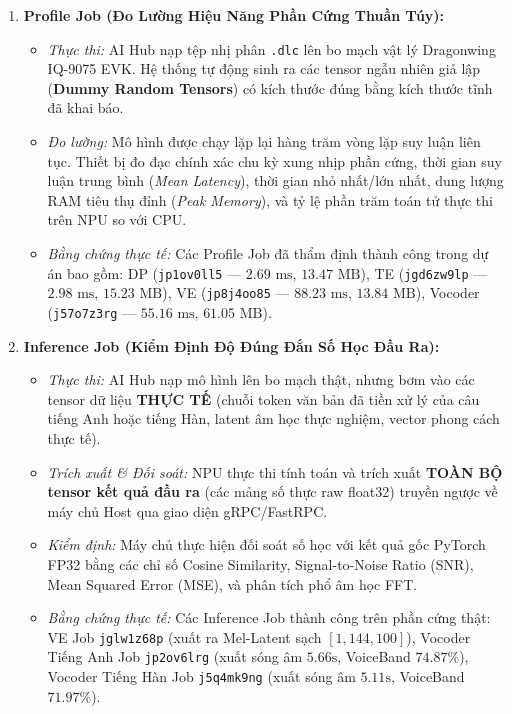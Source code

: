 \documentclass[11pt,a4paper,oneside,table]{report}
\begin{document}
\begin{enumerate}
    \item \textbf{Profile Job (Đo Lường Hiệu Năng Phần Cứng Thuần Túy):}
    \begin{itemize}
        \item \textit{Thực thi:} AI Hub nạp tệp nhị phân \texttt{.dlc} lên bo mạch vật lý Dragonwing IQ-9075 EVK. Hệ thống tự động sinh ra các tensor ngẫu nhiên giả lập (\textbf{Dummy Random Tensors}) có kích thước đúng bằng kích thước tĩnh đã khai báo.
        \item \textit{Đo lường:} Mô hình được chạy lặp lại hàng trăm vòng lặp suy luận liên tục. Thiết bị đo đạc chính xác chu kỳ xung nhịp phần cứng, thời gian suy luận trung bình (\textit{Mean Latency}), thời gian nhỏ nhất/lớn nhất, dung lượng RAM tiêu thụ đỉnh (\textit{Peak Memory}), và tỷ lệ phần trăm toán tử thực thi trên NPU so với CPU.
        \item \textit{Bằng chứng thực tế:} Các Profile Job đã thẩm định thành công trong dự án bao gồm: DP (\texttt{jp1ov0ll5} --- $2.69\text{ ms}$, $13.47\text{ MB}$), TE (\texttt{jgd6zw9lp} --- $2.98\text{ ms}$, $15.23\text{ MB}$), VE (\texttt{jp8j4oo85} --- $88.23\text{ ms}$, $13.84\text{ MB}$), Vocoder (\texttt{j57o7z3rg} --- $55.16\text{ ms}$, $61.05\text{ MB}$).
    \end{itemize}

    \item \textbf{Inference Job (Kiểm Định Độ Đúng Đắn Số Học Đầu Ra):}
    \begin{itemize}
        \item \textit{Thực thi:} AI Hub nạp mô hình lên bo mạch thật, nhưng bơm vào các tensor dữ liệu \textbf{THỰC TẾ} (chuỗi token văn bản đã tiền xử lý của câu tiếng Anh hoặc tiếng Hàn, latent âm học thực nghiệm, vector phong cách thực tế).
        \item \textit{Trích xuất \& Đối soát:} NPU thực thi tính toán và trích xuất \textbf{TOÀN BỘ tensor kết quả đầu ra} (các mảng số thực raw float32) truyền ngược về máy chủ Host qua giao diện gRPC/FastRPC.
        \item \textit{Kiểm định:} Máy chủ thực hiện đối soát số học với kết quả gốc PyTorch FP32 bằng các chỉ số Cosine Similarity, Signal-to-Noise Ratio (SNR), Mean Squared Error (MSE), và phân tích phổ âm học FFT.
        \item \textit{Bằng chứng thực tế:} Các Inference Job thành công trên phần cứng thật: VE Job \texttt{jglw1z68p} (xuất ra Mel-Latent sạch $[1, 144, 100]$), Vocoder Tiếng Anh Job \texttt{jp2ov6lrg} (xuất sóng âm $5.66\text{s}$, VoiceBand $74.87\%$), Vocoder Tiếng Hàn Job \texttt{j5q4mk9ng} (xuất sóng âm $5.11\text{s}$, VoiceBand $71.97\%$).
    \end{itemize}
\end{enumerate}
\end{document}
